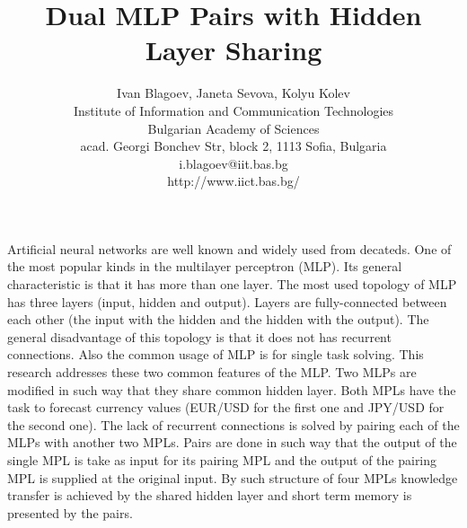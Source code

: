 \documentclass[12pt,a4paper]{article}
\title{\bf Dual MLP Pairs with Hidden Layer Sharing}
\author{Ivan Blagoev, Janeta Sevova, Kolyu Kolev \\
Institute of Information and Communication Technologies \\
Bulgarian Academy of Sciences \\
acad. Georgi Bonchev Str, block 2, 1113 Sofia, Bulgaria \\
i.blagoev@iit.bas.bg \\
http://www.iict.bas.bg/}
\date{}
\begin{document}
\maketitle

Artificial neural networks are well known and widely used from decateds. One of the most popular kinds in the multilayer perceptron (MLP). Its general characteristic is that it has more than one layer. The most used topology of MLP has three layers (input, hidden and output). Layers are fully-connected between each other (the input with the hidden and the hidden with the output). The general disadvantage of this topology is that it does not has recurrent connections. Also the common usage of MLP is for single task solving. This research addresses these two common features of the MLP. Two MLPs are modified in such way that they share common hidden layer. Both MPLs have the task to forecast currency values (EUR/USD for the first one and JPY/USD for the second one). The lack of recurrent connections is solved by pairing each of the MLPs with another two MPLs. Pairs are done in such way that the output of the single MPL is take as input for its pairing MPL and the output of the pairing MPL is supplied at the original input. By such structure of four MPLs knowledge transfer is achieved by the shared hidden layer and short term memory is presented by the pairs. 
\end{document}

